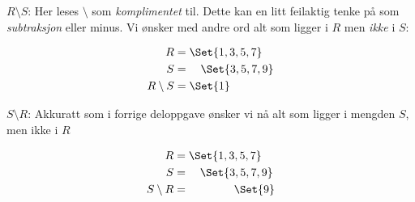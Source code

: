 \documentclass[a4paper,11pt]{article}
\def\firstcircle{(0,0) circle(1cm)}
\def\secondcircle{(0:1cm) circle (1cm)}
\begin{document}
\begin{solution}
  \textcolor{UiT-main}{$R \setminus S$}: Her leses $\setminus$ som
  \emph{komplimentet} til.  Dette kan en litt feilaktig tenke på som
  \emph{subtraksjon} eller minus. Vi ønsker med andre ord alt som ligger i $R$
  men \emph{ikke} i $S$:

  \begin{minipage}{0.5\textwidth}
    \centering
    \begin{align*}
      R & = \Set{1, 3, 5, 7} \\
      S & =   \quad \Set{3, 5, 7, 9} \\
      R \setminus S & =  \Set{1}
    \end{align*}
  \end{minipage}
  \begin{minipage}{0.5\textwidth}
    \centering
  \end{minipage} \medskip

  \textcolor{UiT-main}{$S \setminus R$}: Akkuratt som i forrige deloppgave
  ønsker vi nå alt som ligger i mengden $S$, men ikke i $R$

  \begin{minipage}{0.5\textwidth}
    \centering
    \begin{align*}
      R & = \Set{1, 3, 5, 7} \\
      S & =   \quad \Set{3, 5, 7, 9} \\
      S \setminus R & =  \qquad \qquad \Set{9}
    \end{align*}
  \end{minipage}
  \begin{minipage}{0.5\textwidth}
    \centering
  \end{minipage} \medskip
\end{solution}
\end{document}

